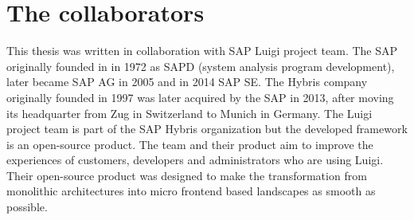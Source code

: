\section{The collaborators}

This thesis was written in collaboration with SAP Luigi project team. The SAP originally founded in in 1972 as SAPD (system analysis program development), later became SAP AG in 2005 and in 2014 SAP SE. The Hybris company originally founded in 1997 was later acquired by the SAP in 2013, after moving its headquarter from Zug in Switzerland to Munich in Germany. The Luigi project team is part of the SAP Hybris organization but the developed framework is an open-source product. 
The team and their product aim to improve the experiences of customers, developers and administrators who are using Luigi. Their open-source product was designed to make the transformation from monolithic architectures into micro frontend based landscapes as smooth as possible. 

 
